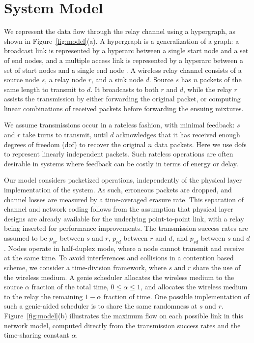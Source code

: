 \documentclass[journal, letterpaper]{IEEEtran}
\begin{document}
\section{System Model}\label{sec:systemModel}
We represent the data flow through the relay channel using a hypergraph, as shown in Figure~\ref{fig:model}(a). A hypergraph is a generalization of a graph: a broadcast link is represented by a hyperarc between a single start node and a set of end nodes, and a multiple access link is represented by a hyperarc between a set of start nodes and a single end node \cite{lun2008coding}. A wireless relay channel consists of a source node $s$, a relay node $r$, and a sink node $d$. Source $s$ has $n$ packets of the same length to transmit to $d$. It broadcasts to both $r$ and $d$, while the relay $r$ assists the transmission by either forwarding the original packet, or computing linear combinations of received packets before forwarding the ensuing mixtures.

We assume transmissions occur in a rateless fashion, with minimal feedback: $s$ and $r$ take turns to transmit, until $d$ acknowledges that it has received enough degrees of freedom (dof) to recover the original $n$ data packets. Here we use dofs to represent linearly independent packets. Such rateless operations are often desirable in systems where feedback can be costly in terms of energy or delay.

Our model considers packetized operations, independently of the physical layer implementation of the system. As such, erroneous packets are dropped, and channel losses are measured by a time-averaged erasure rate. This separation of channel and network coding follows from the assumption that physical layer designs are already available for the underlying point-to-point link, with a relay being inserted for performance improvements. The transmission success rates are assumed to be $p_{sr}$ between $s$ and $r$, $p_{rd}$ between $r$ and $d$, and $p_{sd}$ between $s$ and $d$. Nodes operate in half-duplex mode, where a node cannot transmit and receive at the same time. To avoid interferences and collisions in a contention based scheme, we consider a time-division framework, where $s$ and $r$ share the use of the wireless medium. A genie scheduler allocates the wireless medium to the source $\alpha$ fraction of the total time, $0\leq \alpha \leq 1$, and allocates the wireless medium to the relay the remaining $1-\alpha$ fraction of time. One possible implementation of such a genie-aided scheduler is to share the same randomness at $s$ and $r$. Figure~\ref{fig:model}(b) illustrates the maximum flow on each possible link in this network model, computed directly from the transmission success rates and the time-sharing constant $\alpha$.
\end{document}
